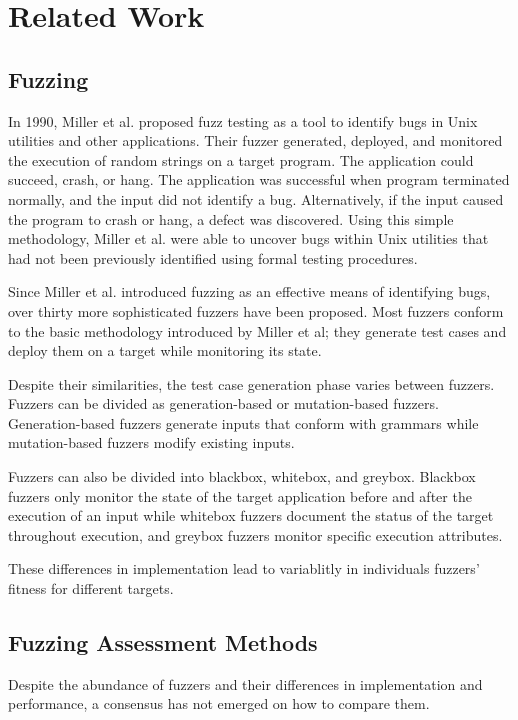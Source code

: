 \section{Related Work}

\subsection{Fuzzing}
In 1990, Miller et al. proposed fuzz testing as a tool to identify bugs in Unix utilities and other 
applications. Their fuzzer generated, deployed, and monitored the execution of random strings on a 
target program. The application could succeed, crash, or hang. The application was successful when 
program terminated normally, and the input did not identify a bug. Alternatively, if the input caused 
the program to crash or hang, a defect was discovered. Using this simple methodology, Miller et al. 
were able to uncover bugs within Unix utilities that had not been previously identified using formal 
testing procedures. \cite{miller_empirical_1990}

Since Miller et al. introduced fuzzing as an effective means of identifying bugs, over thirty more 
sophisticated fuzzers have been proposed. Most fuzzers conform to the basic methodology introduced by 
Miller et al; they generate test cases and deploy them on a target while monitoring its state. 

Despite their similarities, the test case generation phase varies between fuzzers. Fuzzers can be 
divided as generation-based or mutation-based fuzzers. Generation-based fuzzers generate inputs that 
conform with grammars while mutation-based fuzzers modify existing inputs. 

Fuzzers can also be divided into blackbox, whitebox, and greybox. Blackbox fuzzers only monitor the 
state of the target application before and after the execution of an input while whitebox fuzzers 
document the status of the target throughout execution, and greybox fuzzers monitor specific 
execution attributes. \cite{zhu_fuzzing_2022}

These differences in implementation lead to variablitly in individuals fuzzers' fitness for
different targets.

\subsection{Fuzzing Assessment Methods}
Despite the abundance of fuzzers and their differences in implementation and performance, a consensus
 has not emerged on how to compare them.

